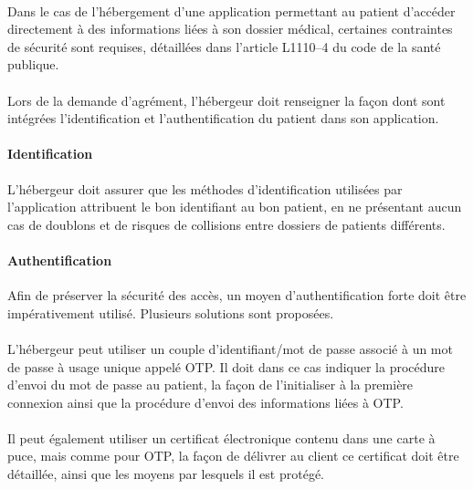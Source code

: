 \paragraph{}
Dans le cas de l'hébergement d'une application permettant au patient d'accéder
directement à des informations liées à son dossier médical, certaines
contraintes de sécurité sont requises, détaillées dans l'article L1110--4 du
code de la santé publique.

\paragraph{}
Lors de la demande d'agrément, l'hébergeur doit renseigner la façon dont sont
intégrées l'identification et l'authentification du patient dans son
application.


\paragraph{Identification\\}
L'hébergeur doit assurer que les méthodes d'identification utilisées par
l'application attribuent le bon identifiant au bon patient, en ne présentant
aucun cas de doublons et de risques de collisions entre dossiers de patients
différents.


\paragraph{Authentification\\}
Afin de préserver la sécurité des accès, un moyen d'authentification forte doit
être impérativement utilisé. Plusieurs solutions sont proposées.

\paragraph{}
L'hébergeur peut utiliser un couple d'identifiant/mot de passe associé à un
mot de passe à usage unique appelé OTP\@. Il doit dans ce cas indiquer la
procédure d'envoi du mot de passe au patient, la façon de l'initialiser à la
première connexion ainsi que la procédure d'envoi des informations liées à
OTP\@.

\paragraph{}
Il peut également utiliser un certificat électronique contenu dans une carte à
puce, mais comme pour OTP, la façon de délivrer au client ce certificat doit
être détaillée, ainsi que les moyens par lesquels il est protégé.

